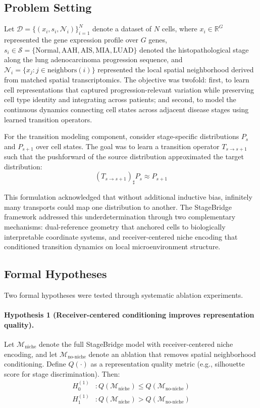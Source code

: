 \subsection{Problem Setting}

Let $\mathcal{D} = \{(x_i, s_i, \mathcal{N}_i)\}_{i=1}^{N}$ denote a dataset of $N$ cells, where $x_i \in \mathbb{R}^{G}$ represented the gene expression profile over $G$ genes, $s_i \in \mathcal{S} = \{\text{Normal}, \text{AAH}, \text{AIS}, \text{MIA}, \text{LUAD}\}$ denoted the histopathological stage along the lung adenocarcinoma progression sequence, and $\mathcal{N}_i = \{x_j : j \in \text{neighbors}(i)\}$ represented the local spatial neighborhood derived from matched spatial transcriptomics. The objective was twofold: first, to learn cell representations that captured progression-relevant variation while preserving cell type identity and integrating across patients; and second, to model the continuous dynamics connecting cell states across adjacent disease stages using learned transition operators.

For the transition modeling component, consider stage-specific distributions $P_s$ and $P_{s+1}$ over cell states. The goal was to learn a transition operator $T_{s \rightarrow s+1}$ such that the pushforward of the source distribution approximated the target distribution:
\begin{equation}
(T_{s \rightarrow s+1})_{\sharp} P_s \approx P_{s+1}
\end{equation}

This formulation acknowledged that without additional inductive bias, infinitely many transports could map one distribution to another. The StageBridge framework addressed this underdetermination through two complementary mechanisms: dual-reference geometry that anchored cells to biologically interpretable coordinate systems, and receiver-centered niche encoding that conditioned transition dynamics on local microenvironment structure.


\subsection{Formal Hypotheses}

Two formal hypotheses were tested through systematic ablation experiments.

\paragraph{Hypothesis 1 (Receiver-centered conditioning improves representation quality).} Let $\mathcal{M}_{\text{niche}}$ denote the full StageBridge model with receiver-centered niche encoding, and let $\mathcal{M}_{\text{no-niche}}$ denote an ablation that removes spatial neighborhood conditioning. Define $Q(\cdot)$ as a representation quality metric (e.g., silhouette score for stage discrimination). Then:
\begin{align}
H_0^{(1)}&: Q(\mathcal{M}_{\text{niche}}) \leq Q(\mathcal{M}_{\text{no-niche}}) \\
H_1^{(1)}&: Q(\mathcal{M}_{\text{niche}}) > Q(\mathcal{M}_{\text{no-niche}})
\end{align}

